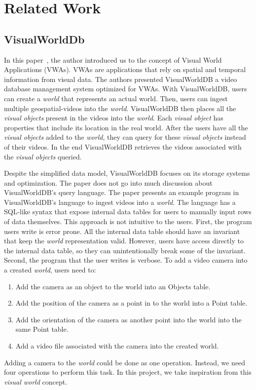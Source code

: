 
\section{Related Work}

\subsection{VisualWorldDb}
In this paper~\cite{haynes:visualworlddb}, the author introduced us to the concept of Visual World Applications (VWAs).
VWAs are applications that rely on spatial and temporal information from visual data.
The authors presented VisualWorldDB a video database management system optimized for VWAs.
With VisualWorldDB, users can create a \emph{world} that represents an actual world.
Then, users can ingest multiple geospatial-videos into the \emph{world}.
VisualWorldDB then places all the \emph{visual objects} present in the videos into the \emph{world}.
Each \emph{visual object} has properties that include its location in the real world.
After the users have all the \emph{visual objects} added to the \emph{world},
they can query for these \emph{visual objects} instead of their videos.
In the end VisualWorldDB retrieves the videos associated with the \emph{visual objects} queried.

Despite the simplified data model, VisualWorldDB focuses on its storage systems and optimization.
The paper does not go into much discussion about VisualWorldDB's query language.
The paper presents an example program in VisualWorldDB's language to ingest videos into a \emph{world}.
The language has a SQL-like syntax that expose internal data tables for users to manually input rows of data themselves.
This approach is not intuitive to the users.
First, the program users write is error prone.
All the internal data table should have an invariant that keep the \emph{world} representation valid.
However, users have access directly to the internal data table,
so they can unintentionally break some of the invariant.
Second, the program that the user writes is verbose.
To add a video camera into a created \emph{world}, users need to:

\begin{enumerate}
    \item
    Add the camera as an object to the world into an Objects table.
    \item
    Add the position of the camera as a point in to the world into a Point table.
    \item
    Add the orientation of the camera as another point into the world into the same Point table.
    \item
    Add a video file associated with the camera into the created world.
\end{enumerate}
Adding a camera to the \emph{world} could be done as one operation.
Instead, we need four operations to perform this task. In this project, we take inspiration from this \emph{visual world} concept.

